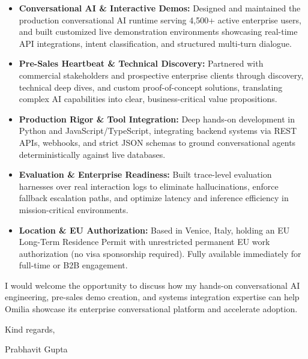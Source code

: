 \documentclass[11pt,a4paper]{article}
\begin{document}
\begin{itemize}[leftmargin=*]
    \item \textbf{Conversational AI \& Interactive Demos:} Designed and maintained the production conversational AI runtime serving 4,500+ active enterprise users, and built customized live demonstration environments showcasing real-time API integrations, intent classification, and structured multi-turn dialogue.
    \item \textbf{Pre-Sales Heartbeat \& Technical Discovery:} Partnered with commercial stakeholders and prospective enterprise clients through discovery, technical deep dives, and custom proof-of-concept solutions, translating complex AI capabilities into clear, business-critical value propositions.
    \item \textbf{Production Rigor \& Tool Integration:} Deep hands-on development in Python and JavaScript/TypeScript, integrating backend systems via REST APIs, webhooks, and strict JSON schemas to ground conversational agents deterministically against live databases.
    \item \textbf{Evaluation \& Enterprise Readiness:} Built trace-level evaluation harnesses over real interaction logs to eliminate hallucinations, enforce fallback escalation paths, and optimize latency and inference efficiency in mission-critical environments.
    \item \textbf{Location \& EU Authorization:} Based in Venice, Italy, holding an EU Long-Term Residence Permit with unrestricted permanent EU work authorization (no visa sponsorship required). Fully available immediately for full-time or B2B engagement.
\end{itemize}

\noindent I would welcome the opportunity to discuss how my hands-on conversational AI engineering, pre-sales demo creation, and systems integration expertise can help Omilia showcase its enterprise conversational platform and accelerate adoption.

\vspace{8pt}

\noindent Kind regards,

\vspace{6pt}

\noindent Prabhavit Gupta
\end{document}
